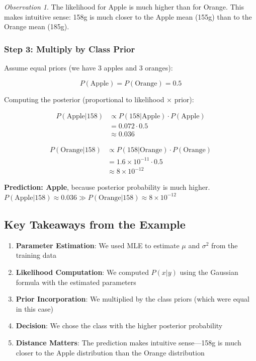 \documentclass[11pt,a4paper]{article}
\theoremstyle{definition}
\theoremstyle{plain}
\theoremstyle{remark}
\newtheorem*{observation}{Observation}
\begin{document}
\begin{observation}
The likelihood for Apple is much higher than for Orange. This makes intuitive sense: 158g is much closer to the Apple mean (155g) than to the Orange mean (185g).
\end{observation}

\subsubsection{Step 3: Multiply by Class Prior}

Assume equal priors (we have 3 apples and 3 oranges):

\[
P(\text{Apple}) = P(\text{Orange}) = 0.5
\]

Computing the posterior (proportional to likelihood × prior):

\begin{align}
P(\text{Apple} | 158) &\propto P(158 | \text{Apple}) \cdot P(\text{Apple}) \\
&= 0.072 \cdot 0.5 \\
&\approx 0.036
\end{align}

\begin{align}
P(\text{Orange} | 158) &\propto P(158 | \text{Orange}) \cdot P(\text{Orange}) \\
&= 1.6 \times 10^{-11} \cdot 0.5 \\
&\approx 8 \times 10^{-12}
\end{align}

\begin{center}
\colorbox{red!15}{\parbox{0.9\textwidth}{
\centering
\textbf{Prediction: Apple}, because posterior probability is much higher.\\[0.2cm]
$P(\text{Apple} | 158) \approx 0.036 \gg P(\text{Orange} | 158) \approx 8 \times 10^{-12}$
}}
\end{center}

\subsection{Key Takeaways from the Example}

\begin{enumerate}
    \item \textbf{Parameter Estimation}: We used MLE to estimate $\mu$ and $\sigma^2$ from the training data
    
    \item \textbf{Likelihood Computation}: We computed $P(x|y)$ using the Gaussian formula with the estimated parameters
    
    \item \textbf{Prior Incorporation}: We multiplied by the class priors (which were equal in this case)
    
    \item \textbf{Decision}: We chose the class with the higher posterior probability
    
    \item \textbf{Distance Matters}: The prediction makes intuitive sense—158g is much closer to the Apple distribution than the Orange distribution
\end{enumerate}
\end{document}
